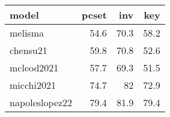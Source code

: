\begin{tabular}{l|rrr}
model          & pcset & inv  & key  \\ \hline
melisma        & 54.6  & 70.3 & 58.2 \\
chensu21       & 59.8  & 70.8 & 52.6 \\
mcleod2021     & 57.7  & 69.3 & 51.5 \\
micchi2021     & 74.7  & 82   & 72.9 \\
napoleslopez22 & 79.4  & 81.9 & 79.4
\end{tabular}
